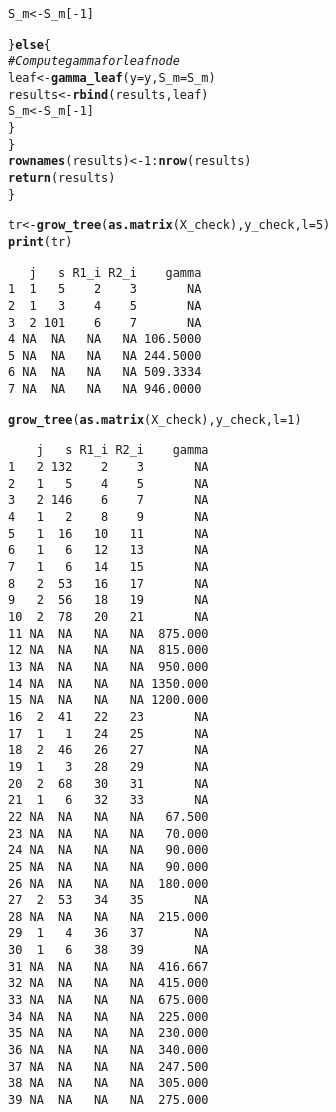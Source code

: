 \documentclass[10pt, a4paper, english]{article}\usepackage[]{graphicx}\usepackage[dvipsnames]{xcolor}
\makeatletter
\newcommand{\hlnum}[1]{\textcolor[rgb]{0.686,0.059,0.569}{#1}}%
\newcommand{\hlcom}[1]{\textcolor[rgb]{0.678,0.584,0.686}{\textit{#1}}}%
\newcommand{\hlopt}[1]{\textcolor[rgb]{0,0,0}{#1}}%
\newcommand{\hlstd}[1]{\textcolor[rgb]{0.345,0.345,0.345}{#1}}%
\newcommand{\hlkwa}[1]{\textcolor[rgb]{0.161,0.373,0.58}{\textbf{#1}}}%
\newcommand{\hlkwb}[1]{\textcolor[rgb]{0.69,0.353,0.396}{#1}}%
\newcommand{\hlkwc}[1]{\textcolor[rgb]{0.333,0.667,0.333}{#1}}%
\newcommand{\hlkwd}[1]{\textcolor[rgb]{0.737,0.353,0.396}{\textbf{#1}}}%
\newenvironment{kframe}{%
 \def\at@end@of@kframe{}%
 \ifinner\ifhmode%
  \def\at@end@of@kframe{\end{minipage}}%
  \begin{minipage}{\columnwidth}%
 \fi\fi%
 \def\FrameCommand##1{\hskip\@totalleftmargin \hskip-\fboxsep
 \colorbox{shadecolor}{##1}\hskip-\fboxsep
     \hskip-\linewidth \hskip-\@totalleftmargin \hskip\columnwidth}%
 \MakeFramed {\advance\hsize-\width
   \@totalleftmargin\z@ \linewidth\hsize
   \@setminipage}}%
 {\par\unskip\endMakeFramed%
 \at@end@of@kframe}
\newenvironment{knitrout}{}{} %
\makeatother
\begin{document}
\begin{knitrout}
\begin{kframe}
\begin{alltt}
    \hlstd{S_m} \hlkwb{<-} \hlstd{S_m[}\hlopt{-}\hlnum{1}\hlstd{]}

    \hlstd{\}} \hlkwa{else} \hlstd{\{}
    \hlcom{# Compute gamma for leaf node}
    \hlstd{leaf} \hlkwb{<-} \hlkwd{gamma_leaf}\hlstd{(}\hlkwc{y}\hlstd{=y,} \hlkwc{S_m} \hlstd{= S_m)}
    \hlstd{results} \hlkwb{<-} \hlkwd{rbind}\hlstd{(results, leaf)}
    \hlstd{S_m} \hlkwb{<-} \hlstd{S_m[}\hlopt{-}\hlnum{1}\hlstd{]}
    \hlstd{\}}
  \hlstd{\}}
  \hlkwd{rownames}\hlstd{(results)} \hlkwb{<-} \hlnum{1}\hlopt{:}\hlkwd{nrow}\hlstd{(results)}
  \hlkwd{return}\hlstd{(results)}
\hlstd{\}}
\end{alltt}
\end{kframe}
\end{knitrout}

\begin{knitrout}
\color{fgcolor}\begin{kframe}
\begin{alltt}
 \hlstd{tr} \hlkwb{<-} \hlkwd{grow_tree}\hlstd{(}\hlkwd{as.matrix}\hlstd{(X_check), y_check,} \hlkwc{l}\hlstd{=} \hlnum{5}\hlstd{)}
\hlkwd{print}\hlstd{(tr)}
\end{alltt}
\begin{verbatim}
   j   s R1_i R2_i    gamma
1  1   5    2    3       NA
2  1   3    4    5       NA
3  2 101    6    7       NA
4 NA  NA   NA   NA 106.5000
5 NA  NA   NA   NA 244.5000
6 NA  NA   NA   NA 509.3334
7 NA  NA   NA   NA 946.0000
\end{verbatim}
\begin{alltt}
  \hlkwd{grow_tree}\hlstd{(}\hlkwd{as.matrix}\hlstd{(X_check), y_check,} \hlkwc{l}\hlstd{=} \hlnum{1}\hlstd{)}
\end{alltt}
\begin{verbatim}
    j   s R1_i R2_i    gamma
1   2 132    2    3       NA
2   1   5    4    5       NA
3   2 146    6    7       NA
4   1   2    8    9       NA
5   1  16   10   11       NA
6   1   6   12   13       NA
7   1   6   14   15       NA
8   2  53   16   17       NA
9   2  56   18   19       NA
10  2  78   20   21       NA
11 NA  NA   NA   NA  875.000
12 NA  NA   NA   NA  815.000
13 NA  NA   NA   NA  950.000
14 NA  NA   NA   NA 1350.000
15 NA  NA   NA   NA 1200.000
16  2  41   22   23       NA
17  1   1   24   25       NA
18  2  46   26   27       NA
19  1   3   28   29       NA
20  2  68   30   31       NA
21  1   6   32   33       NA
22 NA  NA   NA   NA   67.500
23 NA  NA   NA   NA   70.000
24 NA  NA   NA   NA   90.000
25 NA  NA   NA   NA   90.000
26 NA  NA   NA   NA  180.000
27  2  53   34   35       NA
28 NA  NA   NA   NA  215.000
29  1   4   36   37       NA
30  1   6   38   39       NA
31 NA  NA   NA   NA  416.667
32 NA  NA   NA   NA  415.000
33 NA  NA   NA   NA  675.000
34 NA  NA   NA   NA  225.000
35 NA  NA   NA   NA  230.000
36 NA  NA   NA   NA  340.000
37 NA  NA   NA   NA  247.500
38 NA  NA   NA   NA  305.000
39 NA  NA   NA   NA  275.000
\end{verbatim}
\end{kframe}
\end{knitrout}
\end{document}
